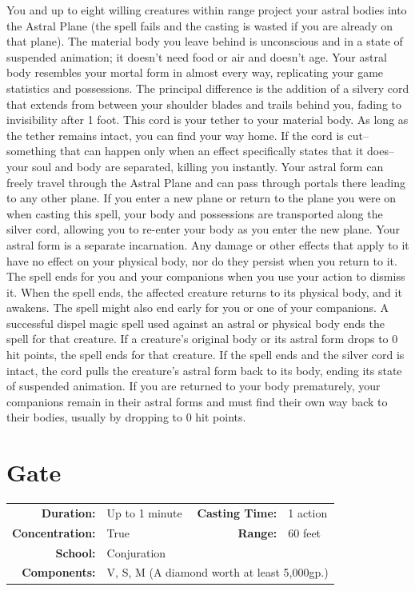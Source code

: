 \documentclass[12pt,showtrims]{memoir}
\begin{document}
\vspace{1\baselineskip}\noindent You and up to eight willing creatures within range project your astral bodies into the Astral Plane (the spell fails and the casting is wasted if you are already on that plane). The material body you leave behind is unconscious and in a state of suspended animation; it doesn't need food or air and doesn't age. Your astral body resembles your mortal form in almost every way, replicating your game statistics and possessions. The principal difference is the addition of a silvery cord that extends from between your shoulder blades and trails behind you, fading to invisibility after 1 foot. This cord is your tether to your material body. As long as the tether remains intact, you can find your way home. If the cord is cut--something that can happen only when an effect specifically states that it does--your soul and body are separated, killing you instantly. Your astral form can freely travel through the Astral Plane and can pass through portals there leading to any other plane. If you enter a new plane or return to the plane you were on when casting this spell, your body and possessions are transported along the silver cord, allowing you to re-enter your body as you enter the new plane. Your astral form is a separate incarnation. Any damage or other effects that apply to it have no effect on your physical body, nor do they persist when you return to it. The spell ends for you and your companions when you use your action to dismiss it. When the spell ends, the affected creature returns to its physical body, and it awakens. The spell might also end early for you or one of your companions. A successful dispel magic spell used against an astral or physical body ends the spell for that creature. If a creature's original body or its astral form drops to 0 hit points, the spell ends for that creature. If the spell ends and the silver cord is intact, the cord pulls the creature's astral form back to its body, ending its state of suspended animation. If you are returned to your body prematurely, your companions remain in their astral forms and must find their own way back to their bodies, usually by dropping to 0 hit points.

\newpage
\section*{Gate}

{
\small\centering\vspace{-6pt}
\begin{tabular}{rlrl}
\toprule

\textbf{Duration:} & Up to 1 minute &
\textbf{Casting Time:} & 1 action \\
\textbf{Concentration:} & True &
\textbf{Range:} & 60 feet \\
\textbf{School:} & Conjuration \\
\textbf{Components:} & \multicolumn{3}{p{0.7\textwidth}}{V, S, M (A diamond worth at least 5,000gp.)}\\

\bottomrule
\end{tabular}
}
\end{document}
